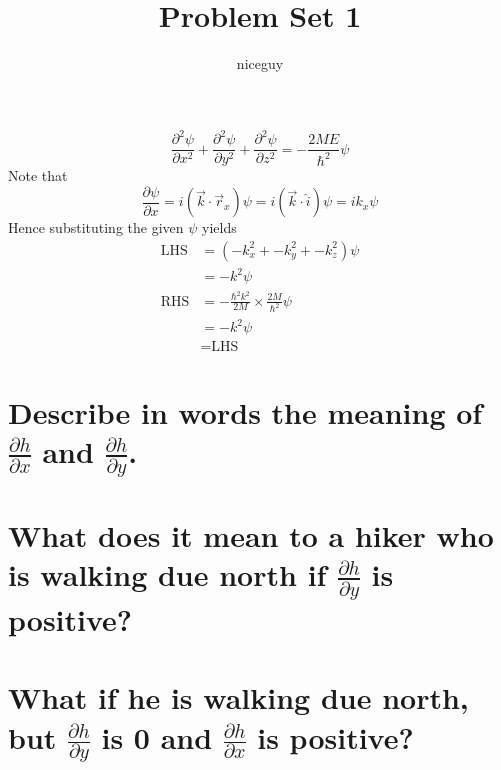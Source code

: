 \documentclass[answers]{exam}
\author{niceguy}
\title{Problem Set 1}
\begin{document}
\maketitle

\begin{questions}


\begin{solution}
	$$\frac{\partial^2\psi}{\partial x^2} + \frac{\partial^2\psi}{\partial y^2} + \frac{\partial^2\psi}{\partial z^2} = -\frac{2ME}{\hbar^2}\psi$$
	Note that
	$$\frac{\partial \psi}{\partial x} = i(\vec{k}\cdot\vec{r}_x)\psi = i(\vec{k}\cdot\hat{i})\psi = ik_x\psi$$
	Hence substituting the given $\psi$ yields
	\begin{align*}
		\text{LHS} &= (-k_x^2 + -k_y^2 + -k_z^2)\psi \\
			   &= -k^2\psi \\
		\text{RHS} &= -\frac{\hbar^2k^2}{2M}\times\frac{2M}{\hbar^2}\psi \\
			   &= -k^2\psi \\
			   &= \text{LHS}
	\end{align*}

\end{solution}


\begin{parts}
	\part{Describe in words the meaning of $\frac{\partial h}{\partial x}$ and $\frac{\partial h}{\partial y}$.}
	\part{What does it mean to a hiker who is walking due north if $\frac{\partial h}{\partial y}$ is positive?}
	\part{What if he is walking due north, but $\frac{\partial h}{\partial y}$ is 0 and $\frac{\partial h}{\partial x}$ is positive?}
\end{parts}


\end{questions}
\end{document}
